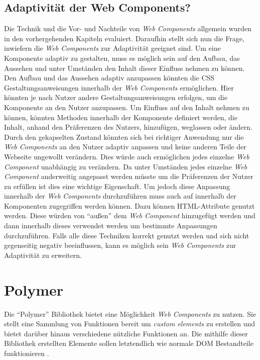 \documentclass[12pt, paper=a4, bibtotoc, toc=listof, headsepline=true, numbers=endperiod]{scrreprt}
\begin{document}
	\section{Adaptivität der Web Components?}
	Die Technik und die Vor- und Nachteile von \emph{Web Components} allgemein wurden in den vorhergehenden Kapiteln evaluiert. Daraufhin stellt sich nun die Frage, inwiefern die \emph{Web Components} zur Adaptivität geeignet sind. Um eine Komponente adaptiv zu gestalten, muss es möglich sein auf den Aufbau, das Aussehen und unter Umständen den Inhalt dieser Einfluss nehmen zu können.
	\newline
	Den Aufbau und das Aussehen adaptiv anzupassen könnten die \ac{CSS} Gestaltungsanweisungen innerhalb der \emph{Web Components} ermöglichen. Hier könnten je nach Nutzer andere Gestaltungsanweisungen erfolgen, um die Komponente an den Nutzer anzupassen. Um Einfluss auf den Inhalt nehmen zu können, könnten Methoden innerhalb der Komponente definiert werden, die Inhalt, anhand den Präferenzen des Nutzers, hinzufügen, weglassen oder ändern. Durch den gekapselten Zustand könnten sich bei richtiger Anwendung nur die \emph{Web Components} an den Nutzer adaptiv anpassen und keine anderen Teile der Webseite ungewollt verändern. Dies würde auch ermöglichen jedes einzelne \emph{Web Component} unabhängig zu verändern. Da unter Umständen jedes einzelne \emph{Web Component} anderweitig angepasst werden müsste um die Präferenzen der Nutzer zu erfüllen ist dies eine wichtige Eigenschaft. Um jedoch diese Anpassung innerhalb der \emph{Web Components} durchzuführen muss auch auf innerhalb der Komponenten zugegriffen werden können. Dazu können HTML-Attribute genutzt werden. Diese würden von \enquote{außen} dem \emph{Web Component} hinzugefügt werden und dann innerhalb dieses verwendet werden um bestimmte Anpassungen durchzuführen. Falls alle diese Techniken korrekt genutzt werden und sich nicht gegenseitig negativ beeinflussen, kann es möglich sein \emph{Web Components} zur Adaptivität zu erweitern.
\chapter{Polymer}
Die \enquote{Polymer} Bibliothek bietet eine Möglichkeit \emph{Web Components} zu nutzen. Sie stellt eine Sammlung von Funktionen bereit um \emph{custom elements} zu erstellen und bietet darüber hinaus verschiedene nützliche Funktionen an. Die mithilfe dieser Bibliothek erstellten Elemente sollen letztendlich wie normale \ac{DOM} Bestandteile funktionieren \cite{polymerFeaOve}.
\end{document}
